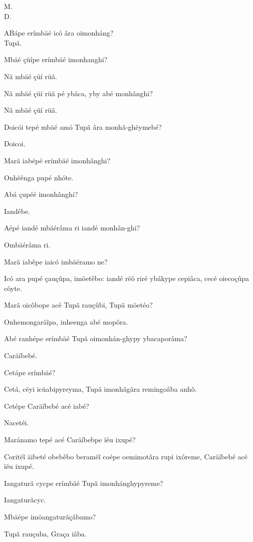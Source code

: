 \documentclass[openany,titlepage,12pt]{book}
\renewcommand{\chaptermark}[1]{\markboth{#1}{}}
\renewcommand{\sectionmark}[1]{\gdef\rightmark{#1}}
\newcommand{\comecalista}[5]{
    \hspace*{-11.7pt}
    \begin{minipage}[t]{0.08\linewidth}
        \flushright #1\\#2
    \end{minipage}
    \hspace{0pt}
    \begin{minipage}[t]{0.94\linewidth}
        \lettrine
        [findent =2pt, nindent=0pt,  lines=2]
        {#3}{#4}#5
    \end{minipage}
    \vspace*{-3pt}
}
\begin{document}
\chaptermark{Dialogo II.}
\sectionmark{Da creaçaõ do mundo.}
\vspace*{2pt}
\comecalista{M.}{D.}{A}{B}
    {ápe erímbäé icó âra oimonháng?\\
    Tupã.}
\begin{alternate}
    \item Mbäé çüípe erímbäé imonhanghi?
    \item Nã mbäé çüí rüã.
    \item Nã mbäé çüí rüã pé ybâca, yby abé monhânghi?
    \item Nã mbäé çüí rüã.
    \item Doicói tepé mbäé amó Tupã âra monhã-ghëymebé?
    \item Doicoi.
    \item Marã iabépé erímbäé imonhânghi?
    \item Onhëênga pupé nhóte.
    \item Abá çupéé imonhânghi?
    \item Iandêbe.
    \item Aépé iandé mbäérâma ri iandé monhân-ghi?
    \item Ombäérâma ri.
    \item Marã iabêpe iaicó imbäéramo ne?
    \item Icó ara pupé çauçûpa, imöetêbo: iandé rëõ
    riré ybákype cepiâca, cecé oiecoçûpa cöyte.
    \item Marã oicôbope acé Tupã rauçûbi, Tupã möetéo?
    \item Onhemongaräîpa, inheenga abé mopôra.
    \item Abé ranhépe erímbäé Tupã oimonhán-ghypy ybacaporâma?
    \item Caräíbebé.
    \item Cetápe erímbäé?
    \item Cetá, cëyi icüabipyreyma, Tupã imonhãgâra
    remingoâba anhõ.
    \item Cetépe Caräíbebé acé iabé?
    \item Nacetéi.
    \item Maránamo tepé acé Caräíbebpe ïéu ixupé?
    \item Coritëĩ äibeté obebêbo beramëĩ coépe\linebreak
    oemimotâra rupi ixôreme, Caräíbebé acé ïéu ixupé.
    \item Iangaturã cycpe erímbäé Tupã imonhánghypyreme?
    \item Iangaturãcyc.
    \item Mbäépe imöangaturãçâbamo?
    \item Tupã rauçuba, Graça iâba.

\end{alternate}
\end{document}
